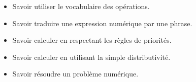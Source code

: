\documentclass[a4paper,dvipsnames]{article}
\begin{document}
\begin{CpsCol}
\begin{itemize}
\item Savoir utiliser le vocabulaire des opérations.
\item Savoir traduire une expression numérique par une phrase.
\item Savoir calculer en respectant les règles de priorités.
\item Savoir calculer en utilisant la simple distributivité.
\item Savoir résoudre un problème numérique.
\end{itemize}
\end{CpsCol}
\end{document}
